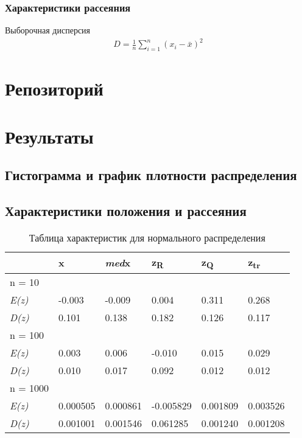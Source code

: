 \subsubsection{Характеристики рассеяния}
Выборочная дисперсия \begin{gather*}
    D = \frac{1}{n}\displaystyle\sum_{i=1}^{n}(x_i - \bar{x})^{2}
\end{gather*}

\section{Репозиторий}
\newpage
\section{Результаты}
\subsection{Гистограмма и график плотности распределения}
\subsection{Характеристики положения и рассеяния}
\begin{table}[H]
\centering
    \begin{tabular}{|l|l|l|l|l|l|}
    \hline
         &  x &   \textit{med}x   &   z\textsubscript{R}  &   z\textsubscript{Q}  &   z\textsubscript{tr}\\ \hline \hline
         n = 10& & & & & \\ \hline
         \textit{E(z)} & -0.003 & -0.009 & 0.004 & 0.311 & 0.268 \\ \hline
         \textit{D(z)} & 0.101       &       0.138       &       0.182     &        0.126      &        0.117 \\ \hline
       \hline
         n = 100& & & & & \\ \hline
         \textit{E(z)} & 0.003       &        0.006      &       -0.010       &        0.015       &        0.029  \\ \hline
         \textit{D(z)} &  0.010       &        0.017       &        0.092      &        0.012       &        0.012  \\ \hline
        \hline
         n = 1000& & & & & \\ \hline
         \textit{E(z)} &  0.000505       &       0.000861       &       -0.005829       &        0.001809       &       0.003526  \\ \hline
         \textit{D(z)} & 0.001001       &       0.001546       &        0.061285       &        0.001240        &       0.001208 \\ \hline
    \end{tabular}
     \caption{Таблица характеристик для нормального распределения}
    \label{tab:my_label}
\end{table}

